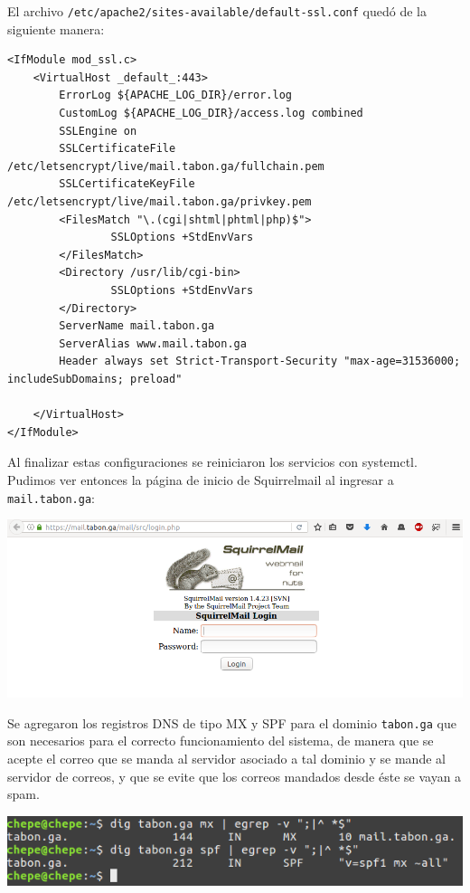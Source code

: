 \documentclass[9pt]{article}
\begin{document}
El archivo \texttt{/etc/apache2/sites-available/default-ssl.conf} quedó de la siguiente manera:
\begin{verbatim}
<IfModule mod_ssl.c>
	<VirtualHost _default_:443>
		ErrorLog ${APACHE_LOG_DIR}/error.log
		CustomLog ${APACHE_LOG_DIR}/access.log combined
		SSLEngine on
		SSLCertificateFile	/etc/letsencrypt/live/mail.tabon.ga/fullchain.pem
		SSLCertificateKeyFile /etc/letsencrypt/live/mail.tabon.ga/privkey.pem
		<FilesMatch "\.(cgi|shtml|phtml|php)$">
				SSLOptions +StdEnvVars
		</FilesMatch>
		<Directory /usr/lib/cgi-bin>
				SSLOptions +StdEnvVars
		</Directory>
		ServerName mail.tabon.ga
		ServerAlias www.mail.tabon.ga
		Header always set Strict-Transport-Security "max-age=31536000; includeSubDomains; preload"
 
	</VirtualHost>
</IfModule>
\end{verbatim}

Al finalizar estas configuraciones se reiniciaron los servicios con \textsf{systemctl}. \\

Pudimos ver entonces la página de inicio de Squirrelmail al ingresar a \texttt{mail.tabon.ga}: \\
\begin{center}
\includegraphics[scale=0.4]{mail/04} \\
\end{center}

Se agregaron los registros DNS de tipo MX y SPF para el dominio \texttt{tabon.ga} que son necesarios para el correcto funcionamiento del sistema, de manera que se acepte el correo que se manda al servidor asociado a tal dominio y se mande al servidor de correos, y que se evite que los correos mandados desde éste se vayan a spam. \\

\begin{center}
\includegraphics[scale=0.5]{mail/01} \\
\end{center}
\end{document}

